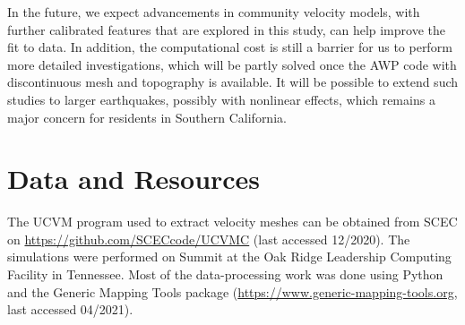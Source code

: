 In the future, we expect advancements in community velocity models, with further calibrated features that are explored in this study, can help improve the fit to data. In addition, the computational cost is still a barrier for us to perform more detailed investigations, which will be partly solved once the AWP code with discontinuous mesh and topography is available. It will be possible to extend such studies to larger earthquakes, possibly with nonlinear effects, which remains a major concern for residents in Southern California.


\section*{Data and Resources}
The UCVM program used to extract velocity meshes can be obtained from SCEC on \url{https://github.com/SCECcode/UCVMC} (last accessed 12/2020). The simulations were performed on Summit at the Oak Ridge Leadership Computing Facility in Tennessee. Most of the data-processing work was done using Python and the Generic Mapping Tools package (\url{https://www.generic-mapping-tools.org}, last accessed 04/2021).


